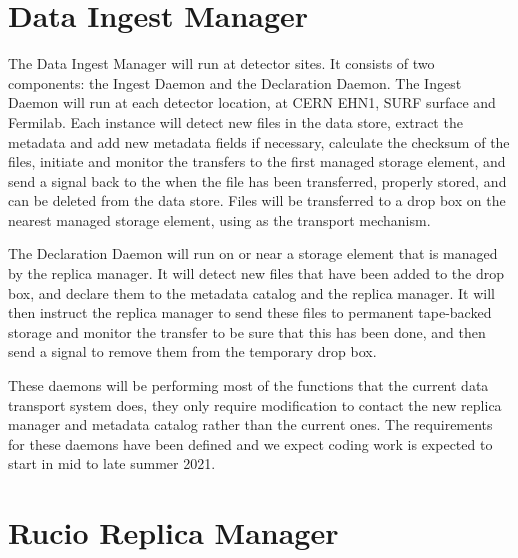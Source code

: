 \documentclass[../main-v1.tex]{subfiles}
\begin{document}

\section{Data Ingest Manager }

The Data Ingest Manager will run at detector sites.  It consists of two components:  the Ingest Daemon and the Declaration Daemon.  The Ingest Daemon will 
run at each detector location, at CERN EHN1, SURF surface and Fermilab. Each instance will
detect new files in the data store, extract the metadata and add new metadata fields
if necessary, calculate the checksum of the files, initiate and monitor the transfers to the first managed 
storage element, and send a signal back to the  when the file has been transferred, properly stored, and can be deleted from the data store.
Files will be transferred to a drop box on the nearest managed storage element, using  %
as the transport mechanism.  

The Declaration Daemon will run on or near a storage element that is managed by the replica manager. %
It will detect new files that have been added to the drop box, and declare them to the metadata catalog and the replica manager.  It will then instruct the replica manager to send these files to permanent tape-backed storage and monitor the transfer to be sure that this has been done, and then send a signal to remove them from the temporary drop box.

These daemons will be performing most of the functions that the current data transport system does, they only 
require modification to contact the new replica manager and metadata catalog rather than the current ones.  The 
requirements for these daemons have been defined   and we expect %
coding work is expected to start in mid to late summer 2021. 

\section{Rucio Replica Manager }
\end{document}
